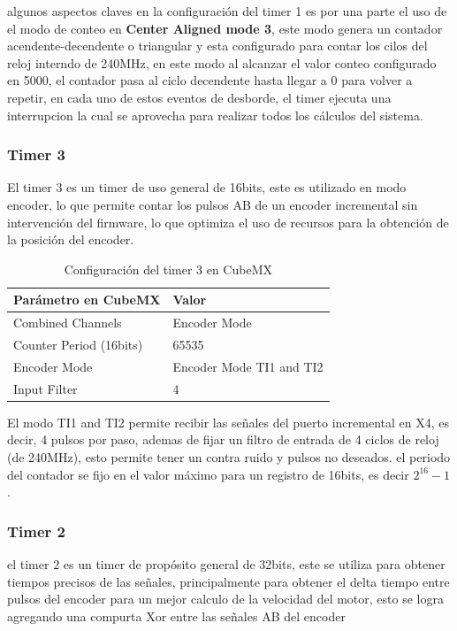 \documentclass[11pt]{report}
\begin{document}
algunos aspectos claves en la configuración del timer 1 es por una parte el uso de el modo de conteo en \textbf{Center Aligned mode 3}, este modo genera un contador acendente-decendente o triangular y esta configurado para contar los cilos del reloj interndo de 240MHz, en este modo al alcanzar el valor conteo configurado en 5000, el contador pasa al ciclo decendente hasta llegar a 0 para volver a repetir, en cada uno de estos eventos de desborde, el timer ejecuta una interrupcion la cual se aprovecha para realizar todos los cálculos del sistema.

\subsubsection{Timer 3}
El timer 3 es un timer de uso general de 16bits, este es utilizado en modo encoder, lo que permite contar los pulsos AB de un encoder incremental sin intervención del firmware, lo que optimiza el uso de recursos para la obtención de la posición del encoder.

\begin{table}[h!]
	\centering
	\begin{tabular}{| l | l |}
		\hline
		\textbf{Parámetro en CubeMX} & \textbf{Valor}           \\
		\hline
		Combined Channels            & Encoder Mode             \\
		Counter Period (16bits)      & 65535                    \\
		Encoder Mode                 & Encoder Mode TI1 and TI2 \\
		Input Filter                 & 4                        \\
		\hline
	\end{tabular}
	\caption{Configuración del timer 3 en CubeMX}
	\label{TIM3_config}
\end{table}
\FloatBarrier

El modo TI1 and TI2 permite recibir las señales del puerto incremental en X4, es decir, 4 pulsos por paso, ademas de fijar un filtro de entrada de 4 ciclos de reloj (de 240MHz), esto permite tener un contra ruido y pulsos no deseados. el periodo del contador se fijo en el valor máximo para un registro de 16bits, es decir $2^{16} - 1$.


\subsubsection{Timer 2}
el timer 2 es un timer de propósito general de 32bits, este se utiliza para obtener tiempos precisos de las señales, principalmente para obtener el delta tiempo entre pulsos del encoder para un mejor calculo de la velocidad del motor, esto se logra agregando una compurta Xor entre las señales AB del encoder
\end{document}
